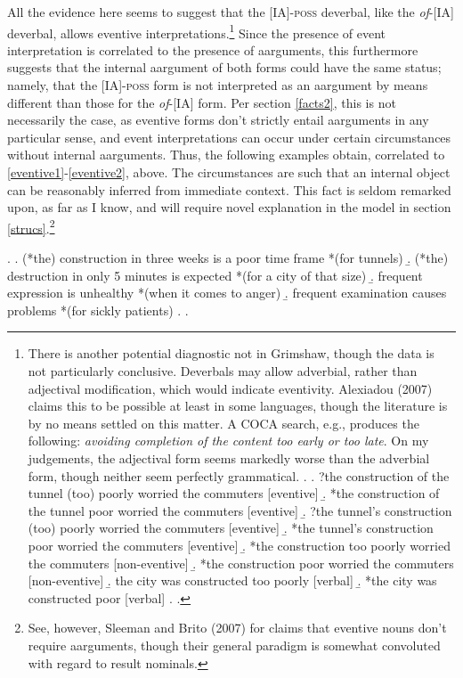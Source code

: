 \documentclass[12pt]{article}
\begin{document}
All the evidence here seems to suggest that the [IA]-\textsc{poss} deverbal, like the \textit{of}-[IA] deverbal, allows eventive interpretations.\footnote{ There is another potential diagnostic not in Grimshaw, though the data is not particularly conclusive. Deverbals may allow adverbial, rather than adjectival modification, which would indicate eventivity. Alexiadou (2007) claims this to be possible at least in some languages, though the literature is by no means settled on this matter. A COCA search, e.g., produces the following: \textit{avoiding completion of the content too early or too late}. On my judgements, the adjectival form seems markedly worse than the adverbial form, though neither seem perfectly grammatical. 
\ex. 
\a. ?the construction of the tunnel (too) poorly worried the commuters \hfill [eventive]
\b. *the construction of the tunnel poor worried the commuters \hfill [eventive]
\b. ?the tunnel's construction (too) poorly worried the commuters \hfill [eventive]
\b. *the tunnel's construction poor worried the commuters \hfill [eventive]
\b. *the construction too poorly worried the commuters \hfill [non-eventive]
\b. *the construction poor worried the commuters \hfill [non-eventive]
\b. the city was constructed too poorly \hfill [verbal]
\b. *the city was constructed poor \hfill [verbal]
\z. \z. } Since the presence of event interpretation is correlated to the presence of aarguments, this furthermore suggests that the internal aargument of both forms could have the same status; namely, that the [IA]-\textsc{poss} form is not interpreted as an aargument by means different than those for the \textit{of}-[IA] form. Per section \ref{facts2}, this is not necessarily the case, as eventive forms don't strictly entail aarguments in any particular sense, and event interpretations can occur under certain circumstances without internal aarguments. Thus, the following examples obtain, correlated to \ref{eventive1}-\ref{eventive2}, above. The circumstances are such that an internal object can be reasonably inferred from immediate context. This fact is seldom remarked upon, as far as I know, and will require novel explanation in the model in section \ref{strucs}.\footnote{ See, however, Sleeman and Brito (2007) for claims that eventive nouns don't require aarguments, though their general paradigm is somewhat convoluted with regard to result nominals.}

\singlespacing

\ex. 
\a. (*the) construction in three weeks is a poor time frame *(for tunnels)
\b. (*the) destruction in only 5 minutes is expected *(for a city of that size)
\b. frequent expression is unhealthy *(when it comes to anger)
\b. frequent examination causes problems *(for sickly patients)
\z. \z. \par
\end{document}
